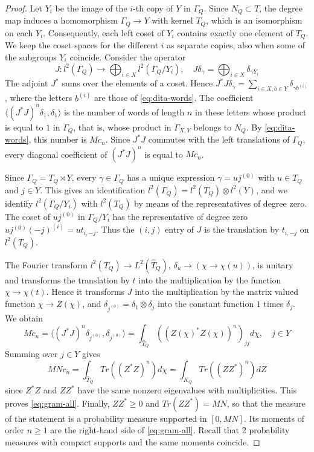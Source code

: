 \documentclass[11pt,reqno]{amsart}
\theoremstyle{definition}
\numberwithin{equation}{section}
\begin{document}
\begin{proof}
Let $Y_i$ be the image of the $i$-th copy of $Y$ in $\Gamma_Q$. Since $N_Q\subset T$, the degree map induces a homomorphism $\Gamma_Q\to Y$ with kernel $T_Q$, which is an isomorphism on each $Y_i$. Consequently, each left coset of $Y_i$ contains exactly one element of $T_Q$. We keep the coset spaces for the different $i$ as separate copies, also when some of the subgroups $Y_i$ coincide. Consider the operator
$$J:l^2(\Gamma_Q)\to\bigoplus_{i\in X}l^2(\Gamma_Q/Y_i),
\quad J\delta_\gamma=\bigoplus_{i\in X}\delta_{\gamma Y_i}$$
The adjoint $J^*$ sums over the elements of a coset. Hence $J^*J\delta_\gamma=\sum_{i\in X,b\in Y}\delta_{\gamma b^{(i)}}$, where the letters $b^{(i)}$ are those of \eqref{eq:dita-words}. The coefficient $\langle(J^*J)^n\delta_1,\delta_1\rangle$ is the number of words of length $n$ in these letters whose product is equal to $1$ in $\Gamma_Q$, that is, whose product in $\Gamma_{X,Y}$ belongs to $N_Q$. By \eqref{eq:dita-words}, this number is $Mc_n$. Since $J^*J$ commutes with the left translations of $\Gamma_Q$, every diagonal coefficient of $(J^*J)^n$ is equal to $Mc_n$.

Since $\Gamma_Q=T_Q\rtimes Y$, every $\gamma\in\Gamma_Q$ has a unique expression $\gamma=uj^{(0)}$ with $u\in T_Q$ and $j\in Y$. This gives an identification $l^2(\Gamma_Q)=l^2(T_Q)\otimes l^2(Y)$, and we identify $l^2(\Gamma_Q/Y_i)$ with $l^2(T_Q)$ by means of the representatives of degree zero. The coset of $uj^{(0)}$ in $\Gamma_Q/Y_i$ has the representative of degree zero $uj^{(0)}(-j)^{(i)}=ut_{i,-j}$. Thus the $(i,j)$ entry of $J$ is the translation by $t_{i,-j}$ on $l^2(T_Q)$.

The Fourier transform $l^2(T_Q)\to L^2(\widehat T_Q)$, $\delta_u\to(\chi\to\chi(u))$, is unitary and transforms the translation by $t$ into the multiplication by the function $\chi\to\chi(t)$. Hence it transforms $J$ into the multiplication by the matrix valued function $\chi\to Z(\chi)$, and $\delta_{j^{(0)}}=\delta_1\otimes\delta_j$ into the constant function $1$ times $\delta_j$. We obtain
$$Mc_n=\langle(J^*J)^n\delta_{j^{(0)}},\delta_{j^{(0)}}\rangle
=\int_{\widehat T_Q}((Z(\chi)^*Z(\chi))^n)_{jj}d\chi,
\quad j\in Y$$
Summing over $j\in Y$ gives
$$MNc_n=\int_{\widehat T_Q}Tr((Z^*Z)^n)d\chi
=\int_{K_Q}Tr((ZZ^*)^n)dZ$$
since $Z^*Z$ and $ZZ^*$ have the same nonzero eigenvalues with multiplicities. This proves \eqref{eq:gram-all}. Finally, $ZZ^*\geq0$ and $Tr(ZZ^*)=MN$, so that the measure of the statement is a probability measure supported in $[0,MN]$. Its moments of order $n\geq1$ are the right-hand side of \eqref{eq:gram-all}. Recall that 2 probability measures with compact supports and the same moments coincide.
\end{proof}
\end{document}
